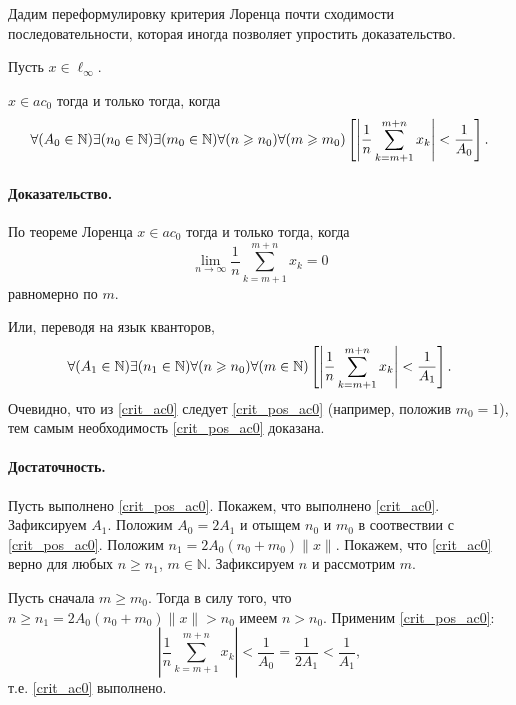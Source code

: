 Дадим переформулировку критерия Лоренца почти сходимости последовательности,
которая иногда позволяет упростить доказательство.


\begin{theorem}
	Пусть $x\in\ell_\infty$.

	$x\in ac_0$ тогда и только тогда, когда
	\begin{equation}\label{crit_pos_ac0}
		\forall(A_0\in\mathbb{N})
		\exists(n_0\in\mathbb{N})
		\exists(m_0\in\mathbb{N})
		\forall(n\geq n_0)
		\forall(m\geq m_0)
		\\
		\left[
			\left|
			\frac{1}{n}
			\sum_{k=m+1}^{m+n} x_k
			\right|
			<
			\frac{1}{A_0}
		\right]
		.
	\end{equation}

\end{theorem}

\paragraph{Доказательство.}
По теореме Лоренца $x\in ac_0$ тогда и только тогда, когда
\begin{equation}\label{Lorencz_ac0}
	\lim_{n\to\infty} \frac{1}{n} \sum_{k=m+1}^{m+n} x_k = 0
\end{equation}
равномерно по $m$.

Или, переводя на язык кванторов,
\begin{equation}\label{crit_ac0}
	\forall(A_1\in\mathbb{N})
	\exists(n_1\in\mathbb{N})
	\forall(n\geq n_0)
	\forall(m \in \mathbb{N})
	\\
	\left[
		\left|
		\frac{1}{n}
		\sum_{k=m+1}^{m+n} x_k
		\right|
		<
		\frac{1}{A_1}
	\right]
	.
\end{equation}
Очевидно, что из \eqref{crit_ac0} следует \eqref{crit_pos_ac0} (например, положив $m_0 = 1$),
тем самым необходимость \eqref{crit_pos_ac0} доказана.

\paragraph{Достаточность.}
Пусть выполнено \eqref{crit_pos_ac0}.
Покажем, что выполнено \eqref{crit_ac0}.
Зафиксируем $A_1$.
Положим $A_0 = 2A_1$ и отыщем $n_0$ и $m_0$ в соотвествии с \eqref{crit_pos_ac0}.
Положим $n_1 = 2A_0(n_0+m_0)\|x\|$.
Покажем, что \eqref{crit_ac0} верно для любых $n\geq n_1$, $m\in \mathbb{N}$.
Зафиксируем $n$ и рассмотрим $m$.

Пусть сначала $m\geq m_0$.
Тогда в силу того, что $n\geq n_1 = 2A_0(n_0+m_0)\|x\| > n_0$ имеем $n>n_0$.
Применим \eqref{crit_pos_ac0}:
\begin{equation}
	\left|
	\frac{1}{n}
	\sum_{k=m+1}^{m+n} x_k
	\right|
	<
	\frac{1}{A_0}
	=
	\frac{1}{2A_1}
	<
	\frac{1}{A_1}
	,
\end{equation}
т.е. \eqref{crit_ac0} выполнено.

